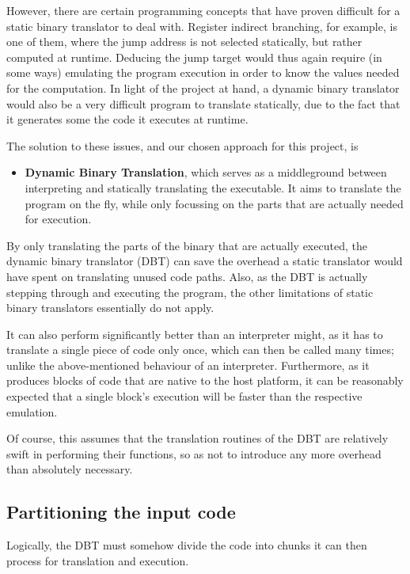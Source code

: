 However, there are certain programming concepts that have proven difficult for a static binary translator to deal with.
Register indirect branching, for example, is one of them, where the jump address is not selected statically, but rather computed at runtime.
Deducing the jump target would thus again require (in some ways) emulating the program execution in order to know the values needed for the computation.
In light of the project at hand, a dynamic binary translator would also be a very difficult program to translate statically, due to the fact that it generates some the code it executes at runtime.

The solution to these issues, and our chosen approach for this project, is
\begin{itemize}
	\item \textbf{Dynamic Binary Translation}, which serves as a middleground between interpreting and statically translating the executable.
	It aims to translate the program on the fly, while only focussing on the parts that are actually needed for execution.
\end{itemize}

By only translating the parts of the binary that are actually executed, the dynamic binary translator (DBT) can save the overhead a static translator would have spent on translating unused code paths.
Also, as the DBT is actually stepping through and executing the program, the other limitations of static binary translators essentially do not apply.

It can also perform significantly better than an interpreter might, as it has to translate a single piece of code only once, which can then be called many times; unlike the above-mentioned behaviour of an interpreter.
Furthermore, as it produces blocks of code that are native to the host platform, it can be reasonably expected that a single block's execution will be faster than the respective emulation.

Of course, this assumes that the translation routines of the DBT are relatively swift in performing their functions, so as not to introduce any more overhead than absolutely necessary.


\subsection{Partitioning the input code}
Logically, the DBT must somehow divide the code into chunks it can then process for translation and execution.














